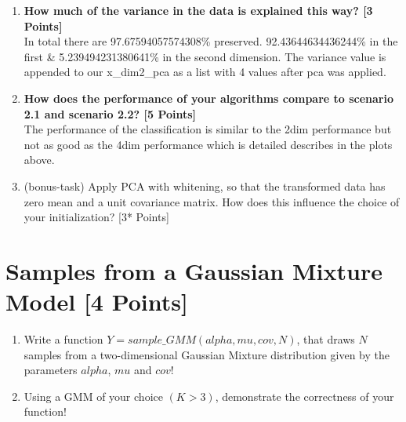 \documentclass[a4paper]{article}
\begin{document}
\newpage

\begin{enumerate}
\item \textbf{How much of the variance in the data is explained this way? [3 Points]} \\
In total there are 97.67594057574308\% preserved. 92.43644634436244\% in the first \& 5.239494231380641\% in the second dimension. The variance value is appended to our x\_dim2\_pca as a list with 4 values after pca was applied.

\item \textbf{How does the performance of your algorithms compare to scenario 2.1 and scenario 2.2? [5 Points]} \\
The performance of the classification is similar to the 2dim performance but not as good as the 4dim performance which is detailed describes in the plots above.  

\item (bonus-task) Apply PCA with whitening, so that the transformed data has zero mean and a unit covariance matrix. How does this influence the choice of your initialization? [3* Points]
\end{enumerate}

\section*{Samples from a Gaussian Mixture Model [4 Points]}
\begin{enumerate}
  \item Write a function $Y = sample\_GMM(alpha, mu, cov, N)$, that draws $N$ samples from a two-dimensional Gaussian Mixture distribution given by the parameters $alpha$, $mu$ and $cov$!
  \item Using a GMM of your choice $(K > 3)$, demonstrate the correctness of your function!
\end{enumerate}
\end{document}

